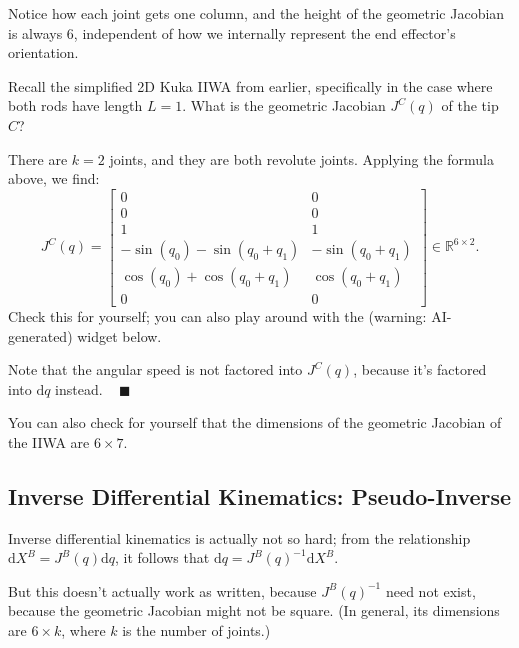 Notice how each joint gets one column, and the
height of the geometric Jacobian is always $6$,
independent of how we internally represent
the end effector's orientation.

\begin{problem}
    Recall the simplified 2D Kuka IIWA from earlier,
    specifically in the case where both rods have length $L = 1$.
    What is the geometric Jacobian $J^C(q)$ of the tip $C$?
\end{problem}

\begin{solution}
    There are $k = 2$ joints, and they are both revolute joints.
    Applying the formula above, we find:
    \[
    J^C(q) = \begin{bmatrix}
    0 & 0 \\
    0 & 0 \\
    1 & 1 \\
    -\sin(q_0) - \sin(q_0 + q_1) & -\sin(q_0 + q_1) \\
    \cos(q_0) + \cos(q_0 + q_1) & \cos(q_0 + q_1) \\
    0 & 0
    \end{bmatrix} \in \mathbb{R}^{6 \times 2}.
    \]
    Check this for yourself;
    you can also play around with the
    (warning: AI-generated) widget below.


    Note that the angular speed is not factored into $J^C(q)$,
    because it's factored into $\mathrm{d}q$ instead. ~ $\blacksquare$
\end{solution}

You can also check for yourself that
the dimensions of the geometric Jacobian of the IIWA are $6 \times 7$.

\subsection{Inverse Differential Kinematics: Pseudo-Inverse}

Inverse differential kinematics is actually not so hard;
from the relationship $\mathrm{d}X^B = J^B(q) \mathrm{d}q$,
it follows that $\mathrm{d}q = J^B(q)^{-1}\mathrm{d}X^B$.

But this doesn't actually work as written,
because $J^B(q)^{-1}$ need not exist,
because the geometric Jacobian might not be square.
(In general, its dimensions are $6 \times k$,
where $k$ is the number of joints.)

